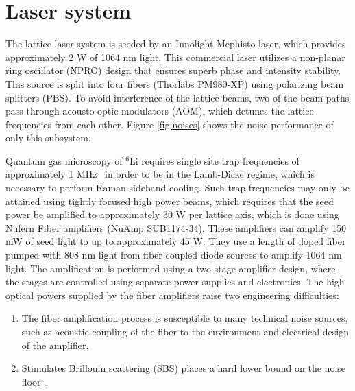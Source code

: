 \documentclass[twocolumn,aps,pra,showpacs,preprintnumbers,bibnotes]{revtex4-1}
\newcommand\Isotope[2]{\ensuremath{^{#1}\mathrm{#2}}}
\newcommand\Li{\Isotope{6}{Li}}
\begin{document}
\section{Laser system}
The lattice laser system is seeded by an Innolight Mephisto laser, which provides approximately 2 W of 1064 nm light. 
This commercial laser utilizes a non-planar ring oscillator (NPRO) design that ensures superb phase and intensity stability. This source is split into four fibers (Thorlabs PM980-XP) using polarizing beam splitters (PBS).
To avoid interference of the lattice beams, two of the beam paths pass through acousto-optic modulators (AOM), which detunes the lattice frequencies from each other. Figure \ref{fig:noises} shows the noise performance of only this subsystem. 

Quantum gas microscopy of \Li{} requires single site trap frequencies of approximately 1 MHz~\cite{Parsons2015} in order to be in the Lamb-Dicke regime, which is necessary to perform Raman sideband cooling.
Such trap frequencies may only be attained using tightly focused high power beams, which requires that the seed power be amplified to approximately 30 W per lattice axis, which is done using Nufern Fiber amplifiers (NuAmp SUB1174-34).
These amplifiers can amplify 150 mW of seed light to up to approximately 45 W. They use a length of doped fiber pumped with 808 nm light from fiber coupled diode sources to amplify 1064 nm light. 
The amplification is performed using a two stage amplifier design, where the stages are controlled using separate power supplies and electronics.
The high optical powers supplied by the fiber amplifiers raise two engineering difficulties:
\begin{enumerate}
  \item The fiber amplification process is susceptible to many technical noise sources, such as acoustic coupling of the fiber to the environment and electrical design of the amplifier, 
  \item Stimulates Brillouin scattering (SBS) places a hard lower bound on the noise floor~\cite{Agrawal2013}. 
\end{enumerate}
\end{document}
